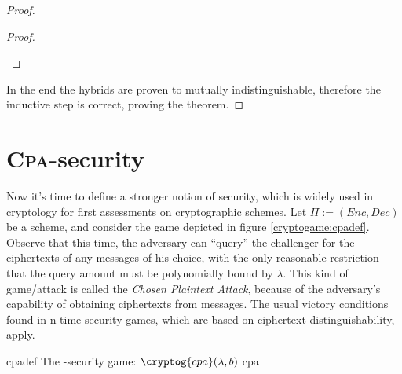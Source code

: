 \begin{proof}
\begin{proof}
\begin{cryptogame}
            \cseqdelay


            \cseqdelay


            \cseqdelay


        \end{cryptogame}
        
    \end{proof}

    In the end the hybrids are proven to mutually indistinguishable, therefore the inductive step is correct, proving the theorem.

\end{proof}

\section{\textsc{Cpa}-security}

Now it's time to define a stronger notion of security, which is widely used in cryptology for first assessments on cryptographic schemes. Let $\Pi := (Enc, Dec)$ be a \ske{} scheme, and consider the game depicted in figure \ref{cryptogame:cpadef}. Observe that this time, the adversary can ``query'' the challenger for the ciphertexts of any messages of his choice, with the only reasonable restriction that the query amount must be polynomially bound by $\lambda$. This kind of game/attack is called the \emph{Chosen Plaintext Attack}, because of the adversary's capability of obtaining ciphertexts from messages. The usual victory conditions found in n-time security games, which are based on ciphertext distinguishability, apply.

\begin{cryptogame}
    {cpadef}
    {The \cpa-security game: $\cryptog{cpa}(\lambda, b)$}
    {cpa}


    \cseqbeginloop
    \cseqendloop

    \cseqdelay


    \cseqdelay

    \cseqbeginloop
    \cseqendloop

    \cseqdelay


\end{cryptogame}

